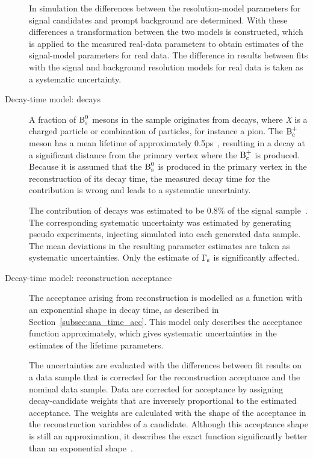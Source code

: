 \begin{description}
In simulation the differences between the resolution-model parameters for signal candidates and prompt background are determined. With
these differences a transformation between the two models is constructed, which is applied to the measured real-data parameters to obtain
estimates of the signal-model parameters for real data. The difference in results between fits with the signal and background
resolution models for real data is taken as a systematic uncertainty.

\item[Decay-time model: \BctoBsX{} decays]
A fraction of $\text{B}_\text{s}^\text{0}$ mesons in the \BstoJpsiKK{} sample originates from \BctoBsX{} decays, where \textit{X} is a charged particle or
combination of particles, for instance a pion. The $\text{B}_\text{c}^\text{+}$ meson has a mean lifetime of approximately 0.5\unitsp{}ps~\cite{PDG}, resulting in
a decay at a significant distance from the primary vertex where the $\text{B}_\text{c}^\text{+}$ is produced. Because it is assumed that the $\text{B}_\text{s}^\text{0}$ is produced in
the primary vertex in the reconstruction of its decay time, the measured decay time for the \BctoBsX{} contribution is wrong and leads to a
systematic uncertainty.

The contribution of \BctoBsX{} decays was estimated to be 0.8\% of the \BstoJpsiKK{} signal sample~\cite{LHCb-ANA-2014-039}. The
corresponding systematic uncertainty was estimated by generating pseudo experiments, injecting simulated \BctoBsJpsiKKX{} into each
generated data sample. The mean deviations in the resulting parameter estimates are taken as systematic uncertainties. Only the estimate of
$\Gamma_\text{s}$ is significantly affected.

\item[Decay-time model: reconstruction acceptance]
The acceptance arising from reconstruction is modelled as a function with an exponential shape in decay time, as described in
Section~\ref{subsec:ana_time_acc}. This model only describes the acceptance function approximately, which gives systematic uncertainties in
the estimates of the lifetime parameters.

The uncertainties are evaluated with the differences between fit results on a data sample that is corrected for the reconstruction
acceptance and the nominal data sample. Data are corrected for acceptance by assigning decay-candidate weights that are inversely
proportional to the estimated acceptance. The weights are calculated with the shape of the acceptance in the reconstruction variables of a
candidate. Although this acceptance shape is still an approximation, it describes the exact function significantly better than an
exponential shape~\cite{LHCb-ANA-2014-039}.


\end{description}
